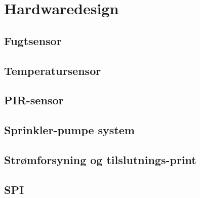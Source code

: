 \chapter{Hardwaredesign}

\section{Fugtsensor}


\section{Temperatursensor}


\section{PIR-sensor}


\section{Sprinkler-pumpe system}


\section{Strømforsyning og tilslutnings-print}


\section{SPI}

